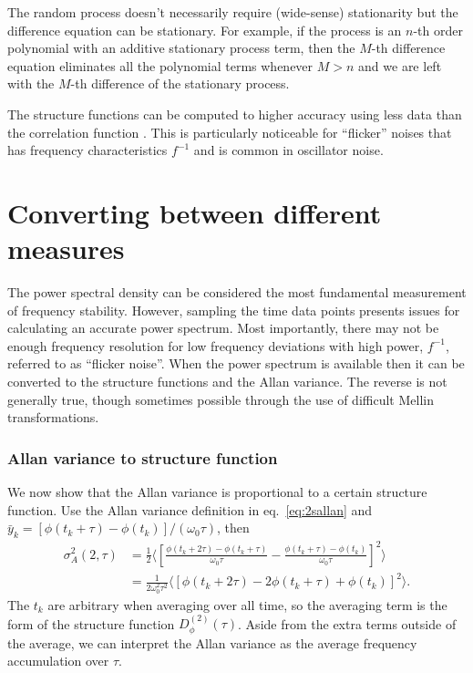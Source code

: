 The random process doesn't necessarily require (wide-sense) stationarity but the difference equation can be stationary. For example, if the process is an $n$-th order polynomial with an additive stationary process term, then the $M$-th difference equation eliminates all the polynomial terms whenever $M > n$ and we are left with the $M$-th difference of the stationary process. 

The structure functions can be computed to higher accuracy using less data than the correlation function \cite{}. This is particularly noticeable for ``flicker'' noises that has frequency characteristics $f^{-1}$ and is common in oscillator noise.

\section{Converting between different measures} \label{sec:convert}
%
The power spectral density can be considered the most fundamental measurement of frequency stability. However, sampling the time data points presents issues for calculating an accurate power spectrum. Most importantly, there may not be enough frequency resolution for low frequency deviations with high power, $f^{-1}$, referred to as ``flicker noise''. When the power spectrum is available then it can be converted to the structure functions and the Allan variance. The reverse is not generally true, though sometimes possible through the use of difficult Mellin transformations.

\subsubsection*{Allan variance to structure function}
%
We now show that the Allan variance is proportional to a certain structure function. Use the Allan variance definition in eq.~\ref{eq:2sallan} and $\bar{y}_k = [\phi(t_k+\tau) - \phi(t_k)]/(\omega_0\tau)$, then
%
\begin{align} \label{eq:avtosf}
\sigma_A^2(2, \tau) &= \frac{1}{2}\bigg\langle \left[\frac{\phi(t_k+2\tau) - \phi(t_k+\tau)}{\omega_0\tau} - \frac{\phi(t_k+\tau) - \phi(t_k)}{\omega_0\tau}\right]^2 \bigg\rangle \\
&= \frac{1}{2\omega_0^2\tau^2} \langle\left[ \phi(t_k+2\tau) - 2\phi(t_k+\tau) + \phi(t_k) \right]^2\rangle.
\end{align}
%
The $t_k$ are arbitrary when averaging over all time, so the averaging term is the form of the structure function $D_\phi^{(2)}(\tau)$. Aside from the extra terms outside of the average, we can interpret the Allan variance as the average frequency accumulation over $\tau$.

